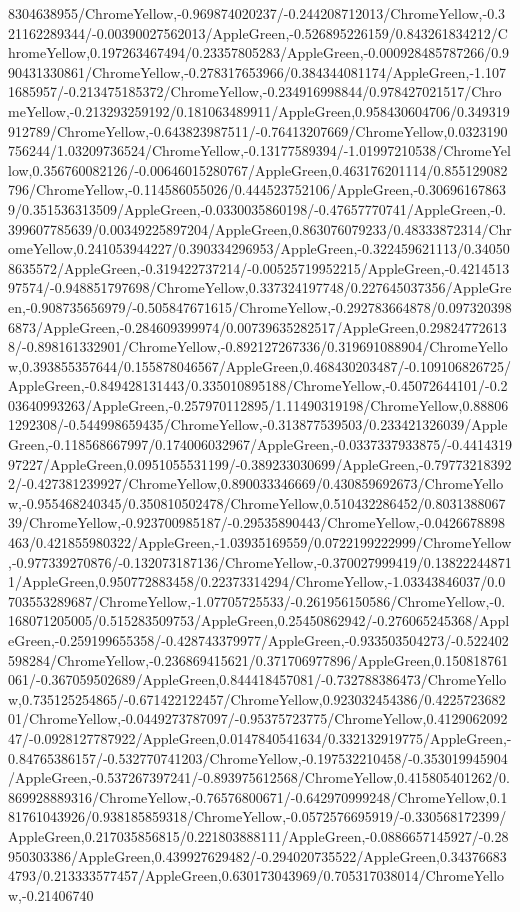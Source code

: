 {\begin{tikzternal}
8304638955/ChromeYellow,-0.969874020237/-0.244208712013/ChromeYellow,-0.321162289344/-0.00390027562013/AppleGreen,-0.526895226159/0.843261834212/ChromeYellow,0.197263467494/0.23357805283/AppleGreen,-0.000928485787266/0.990431330861/ChromeYellow,-0.278317653966/0.384344081174/AppleGreen,-1.1071685957/-0.213475185372/ChromeYellow,-0.234916998844/0.978427021517/ChromeYellow,-0.213293259192/0.181063489911/AppleGreen,0.958430604706/0.349319912789/ChromeYellow,-0.643823987511/-0.76413207669/ChromeYellow,0.0323190756244/1.03209736524/ChromeYellow,-0.13177589394/-1.01997210538/ChromeYellow,0.356760082126/-0.00646015280767/AppleGreen,0.463176201114/0.855129082796/ChromeYellow,-0.114586055026/0.444523752106/AppleGreen,-0.306961678639/0.351536313509/AppleGreen,-0.0330035860198/-0.47657770741/AppleGreen,-0.399607785639/0.00349225897204/AppleGreen,0.863076079233/0.48333872314/ChromeYellow,0.241053944227/0.390334296953/AppleGreen,-0.322459621113/0.340508635572/AppleGreen,-0.319422737214/-0.00525719952215/AppleGreen,-0.421451397574/-0.948851797698/ChromeYellow,0.337324197748/0.227645037356/AppleGreen,-0.908735656979/-0.505847671615/ChromeYellow,-0.292783664878/0.0973203986873/AppleGreen,-0.284609399974/0.00739635282517/AppleGreen,0.298247726138/-0.898161332901/ChromeYellow,-0.892127267336/0.319691088904/ChromeYellow,0.393855357644/0.155878046567/AppleGreen,0.468430203487/-0.109106826725/AppleGreen,-0.849428131443/0.335010895188/ChromeYellow,-0.45072644101/-0.203640993263/AppleGreen,-0.257970112895/1.11490319198/ChromeYellow,0.888061292308/-0.544998659435/ChromeYellow,-0.313877539503/0.233421326039/AppleGreen,-0.118568667997/0.174006032967/AppleGreen,-0.0337337933875/-0.441431997227/AppleGreen,0.0951055531199/-0.389233030699/AppleGreen,-0.797732183922/-0.427381239927/ChromeYellow,0.890033346669/0.430859692673/ChromeYellow,-0.955468240345/0.350810502478/ChromeYellow,0.510432286452/0.803138806739/ChromeYellow,-0.923700985187/-0.29535890443/ChromeYellow,-0.0426678898463/0.421855980322/AppleGreen,-1.03935169559/0.0722199222999/ChromeYellow,-0.977339270876/-0.132073187136/ChromeYellow,-0.370027999419/0.138222448711/AppleGreen,0.950772883458/0.22373314294/ChromeYellow,-1.03343846037/0.0703553289687/ChromeYellow,-1.07705725533/-0.261956150586/ChromeYellow,-0.168071205005/0.515283509753/AppleGreen,0.25450862942/-0.276065245368/AppleGreen,-0.259199655358/-0.428743379977/AppleGreen,-0.933503504273/-0.522402598284/ChromeYellow,-0.236869415621/0.371706977896/AppleGreen,0.150818761061/-0.367059502689/AppleGreen,0.844418457081/-0.732788386473/ChromeYellow,0.735125254865/-0.671422122457/ChromeYellow,0.923032454386/0.422572368201/ChromeYellow,-0.0449273787097/-0.95375723775/ChromeYellow,0.412906209247/-0.0928127787922/AppleGreen,0.0147840541634/0.332132919775/AppleGreen,-0.84765386157/-0.532770741203/ChromeYellow,-0.197532210458/-0.353019945904/AppleGreen,-0.537267397241/-0.893975612568/ChromeYellow,0.415805401262/0.869928889316/ChromeYellow,-0.76576800671/-0.642970999248/ChromeYellow,0.181761043926/0.938185859318/ChromeYellow,-0.0572576695919/-0.330568172399/AppleGreen,0.217035856815/0.221803888111/AppleGreen,-0.0886657145927/-0.28950303386/AppleGreen,0.439927629482/-0.294020735522/AppleGreen,0.343766834793/0.213333577457/AppleGreen,0.630173043969/0.705317038014/ChromeYellow,-0.21406740
\end{tikzternal}}
